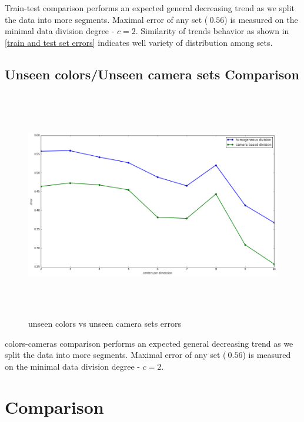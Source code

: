 Train-test comparison performs an expected general decreasing trend as we split the data into more segments.
Maximal error of any set ($~0.56$) is measured on the minimal data division degree - $c=2$. Similarity of trends behavior  as shown in \ref{train and test set errors} indicates well variety of distribution among sets.
\subsection{Unseen colors/Unseen camera sets Comparison}

\begin{figure}[H] 
	\includegraphics[width=\linewidth,height=10cm,keepaspectratio]{Figures/color_cam}
	\caption[unseen colors vs unseen camera sets errors]
	{unseen colors vs unseen camera sets errors}
	\label{unseen colors vs unseen camera sets errors}
\end{figure}

colors-cameras comparison performs an expected general decreasing trend as we split the data into more segments.
Maximal error of any set ($~0.56$) is measured on the minimal data division degree - $c=2$.



\section{Comparison}

